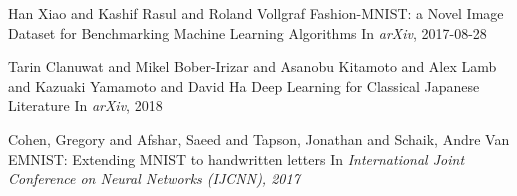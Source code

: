 \documentclass{article}
\begin{document}
\begin{thebibliography}{1}
Han Xiao and Kashif Rasul and Roland Vollgraf
\newblock Fashion-MNIST: a Novel Image Dataset for Benchmarking Machine Learning Algorithms
\newblock In {\em arXiv}, 2017-08-28

Tarin Clanuwat and Mikel Bober-Irizar and Asanobu Kitamoto and Alex Lamb and Kazuaki Yamamoto and David Ha
\newblock Deep Learning for Classical Japanese Literature
\newblock In {\em arXiv}, 2018

Cohen, Gregory and Afshar, Saeed and Tapson, Jonathan and Schaik, Andre Van
\newblock EMNIST: Extending MNIST to handwritten letters
\newblock In {\em International Joint Conference on Neural Networks (IJCNN), 2017}


\end{thebibliography}
\end{document}
